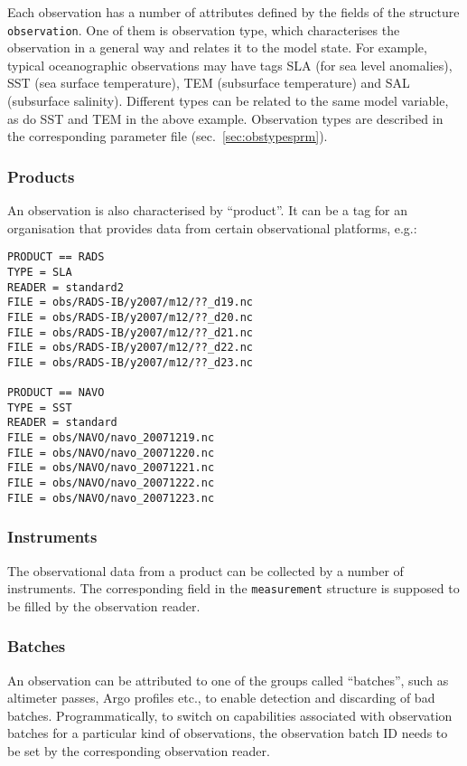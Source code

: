 \documentclass[11pt]{report}
\begin{document}
Each observation has a number of attributes defined by the fields of the structure \verb|observation|.
One of them is observation type, which characterises the observation in a general way and relates it to the model state.
For example, typical oceanographic observations may have tags SLA (for sea level anomalies), SST (sea surface temperature), TEM (subsurface temperature) and SAL (subsurface salinity).
Different types can be related to the same model variable, as do SST and TEM in the above example.
Observation types are described in the corresponding parameter file (sec.~\ref{sec:obstypesprm}).

\subsubsection{Products}

An observation is also characterised by ``product''.
It can be a tag for an organisation that provides data from certain observational platforms, e.g.:
\begin{Verbatim}[frame=single,fontsize=\footnotesize]
PRODUCT == RADS
TYPE = SLA
READER = standard2
FILE = obs/RADS-IB/y2007/m12/??_d19.nc
FILE = obs/RADS-IB/y2007/m12/??_d20.nc
FILE = obs/RADS-IB/y2007/m12/??_d21.nc
FILE = obs/RADS-IB/y2007/m12/??_d22.nc
FILE = obs/RADS-IB/y2007/m12/??_d23.nc

PRODUCT == NAVO
TYPE = SST
READER = standard
FILE = obs/NAVO/navo_20071219.nc
FILE = obs/NAVO/navo_20071220.nc
FILE = obs/NAVO/navo_20071221.nc
FILE = obs/NAVO/navo_20071222.nc
FILE = obs/NAVO/navo_20071223.nc
\end{Verbatim}

\subsubsection{Instruments}

The observational data from a product can be collected by a number of instruments.
The corresponding field in the \verb|measurement| structure is supposed to be filled by the observation reader.

\subsubsection{Batches}

An observation can be attributed to one of the groups called ``batches'', such as altimeter passes, Argo profiles etc., to enable detection and discarding of bad batches.
Programmatically, to switch on capabilities associated with observation batches for a particular kind of observations, the observation batch ID needs to be set by the corresponding observation reader.
\end{document}
